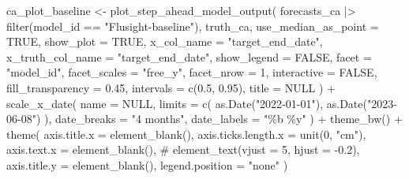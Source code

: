 \documentclass[
]{article}
\newenvironment{Shaded}{\begin{snugshade}}{\end{snugshade}}
\newcommand{\AttributeTok}[1]{\textcolor[rgb]{0.40,0.45,0.13}{#1}}
\newcommand{\CommentTok}[1]{\textcolor[rgb]{0.37,0.37,0.37}{#1}}
\newcommand{\ConstantTok}[1]{\textcolor[rgb]{0.56,0.35,0.01}{#1}}
\newcommand{\DecValTok}[1]{\textcolor[rgb]{0.68,0.00,0.00}{#1}}
\newcommand{\FloatTok}[1]{\textcolor[rgb]{0.68,0.00,0.00}{#1}}
\newcommand{\FunctionTok}[1]{\textcolor[rgb]{0.28,0.35,0.67}{#1}}
\newcommand{\NormalTok}[1]{\textcolor[rgb]{0.00,0.23,0.31}{#1}}
\newcommand{\OtherTok}[1]{\textcolor[rgb]{0.00,0.23,0.31}{#1}}
\newcommand{\SpecialCharTok}[1]{\textcolor[rgb]{0.37,0.37,0.37}{#1}}
\newcommand{\StringTok}[1]{\textcolor[rgb]{0.13,0.47,0.30}{#1}}
\begin{document}
\begin{Shaded}
\begin{Highlighting}[]
\NormalTok{ca\_plot\_baseline }\OtherTok{\textless{}{-}}
  \FunctionTok{plot\_step\_ahead\_model\_output}\NormalTok{(}
\NormalTok{    forecasts\_ca }\SpecialCharTok{|\textgreater{}} \FunctionTok{filter}\NormalTok{(model\_id }\SpecialCharTok{==} \StringTok{"Flusight{-}baseline"}\NormalTok{),}
\NormalTok{    truth\_ca,}
    \AttributeTok{use\_median\_as\_point =} \ConstantTok{TRUE}\NormalTok{,}
    \AttributeTok{show\_plot =} \ConstantTok{TRUE}\NormalTok{,}
    \AttributeTok{x\_col\_name =} \StringTok{"target\_end\_date"}\NormalTok{,}
    \AttributeTok{x\_truth\_col\_name =} \StringTok{"target\_end\_date"}\NormalTok{,}
    \AttributeTok{show\_legend =} \ConstantTok{FALSE}\NormalTok{,}
    \AttributeTok{facet =} \StringTok{"model\_id"}\NormalTok{,}
    \AttributeTok{facet\_scales =} \StringTok{"free\_y"}\NormalTok{,}
    \AttributeTok{facet\_nrow =} \DecValTok{1}\NormalTok{,}
    \AttributeTok{interactive =} \ConstantTok{FALSE}\NormalTok{,}
    \AttributeTok{fill\_transparency =} \FloatTok{0.45}\NormalTok{,}
    \AttributeTok{intervals =} \FunctionTok{c}\NormalTok{(}\FloatTok{0.5}\NormalTok{, }\FloatTok{0.95}\NormalTok{),}
    \AttributeTok{title =} \ConstantTok{NULL}
\NormalTok{  ) }\SpecialCharTok{+}
  \FunctionTok{scale\_x\_date}\NormalTok{(}
    \AttributeTok{name =} \ConstantTok{NULL}\NormalTok{, }\AttributeTok{limits =} \FunctionTok{c}\NormalTok{(}
      \FunctionTok{as.Date}\NormalTok{(}\StringTok{"2022{-}01{-}01"}\NormalTok{),}
      \FunctionTok{as.Date}\NormalTok{(}\StringTok{"2023{-}06{-}08"}\NormalTok{)}
\NormalTok{    ),}
    \AttributeTok{date\_breaks =} \StringTok{"4 months"}\NormalTok{, }\AttributeTok{date\_labels =} \StringTok{"\%b \textquotesingle{}\%y"}
\NormalTok{  ) }\SpecialCharTok{+}
  \FunctionTok{theme\_bw}\NormalTok{() }\SpecialCharTok{+}
  \FunctionTok{theme}\NormalTok{(}
    \AttributeTok{axis.title.x =} \FunctionTok{element\_blank}\NormalTok{(),}
    \AttributeTok{axis.ticks.length.x =} \FunctionTok{unit}\NormalTok{(}\DecValTok{0}\NormalTok{, }\StringTok{"cm"}\NormalTok{),}
    \AttributeTok{axis.text.x =} \FunctionTok{element\_blank}\NormalTok{(), }\CommentTok{\# element\_text(vjust = 5, hjust = {-}0.2),}
    \AttributeTok{axis.title.y =} \FunctionTok{element\_blank}\NormalTok{(),}
    \AttributeTok{legend.position =} \StringTok{"none"}
\NormalTok{  )}


\end{Highlighting}
\end{Shaded}
\end{document}
